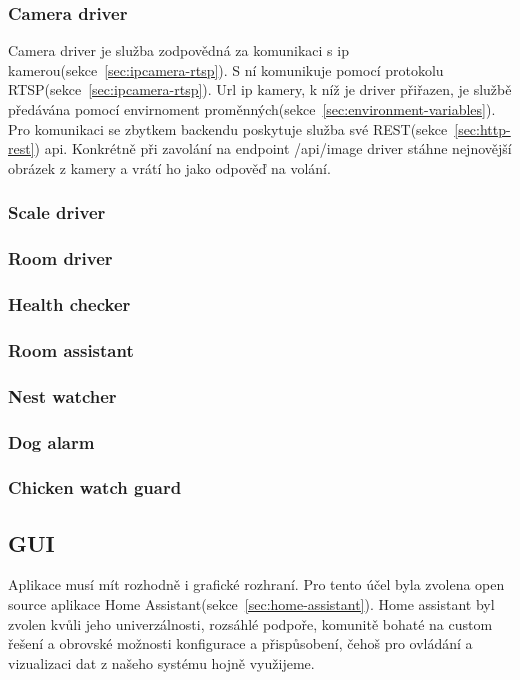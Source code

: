 \subsubsection{Camera driver}
Camera driver je služba zodpovědná za komunikaci s ip kamerou(sekce~\ref{sec:ipcamera-rtsp}).
S ní komunikuje pomocí protokolu RTSP(sekce~\ref{sec:ipcamera-rtsp}).
Url ip kamery, k níž je driver přiřazen, je službě předávána pomocí envirnoment proměnných(sekce~\ref{sec:environment-variables}).
Pro komunikaci se zbytkem backendu poskytuje služba své REST(sekce~\ref{sec:http-rest}) api.
Konkrétně při zavolání na endpoint /api/image driver stáhne nejnovější obrázek z kamery a vrátí ho jako odpověď na volání.

\subsubsection{Scale driver}

\subsubsection{Room driver}

\subsubsection{Health checker}

\subsubsection{Room assistant}

\subsubsection{Nest watcher}

\subsubsection{Dog alarm}

\subsubsection{Chicken watch guard}

\subsection{GUI}
Aplikace musí mít rozhodně i grafické rozhraní.
Pro tento účel byla zvolena open source aplikace Home Assistant(sekce~\ref{sec:home-assistant}).
Home assistant byl zvolen kvůli jeho univerzálnosti, rozsáhlé podpoře, komunitě bohaté na custom řešení a obrovské možnosti konfigurace a přispůsobení, čehoš pro ovládání a vizualizaci dat z našeho systému hojně využijeme.

